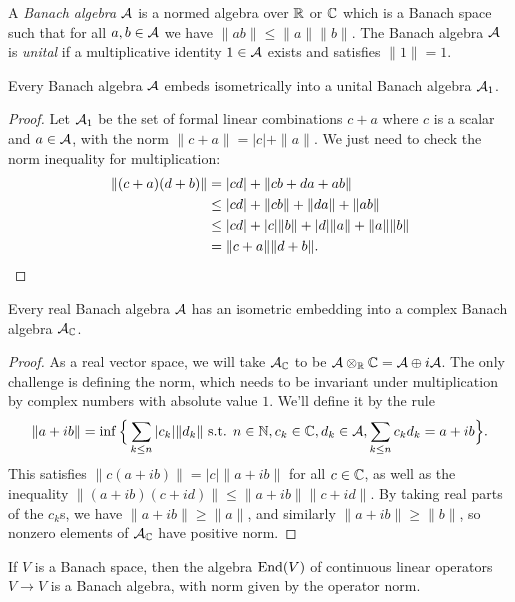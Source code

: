 \begin{defn} A \emph{Banach algebra} $\mathcal{A}$ is a normed algebra over $\mathbb{R}$ or $\mathbb{C}$ which is a Banach space such that for all $a,b \in \mathcal{A}$ we have $\|ab\| \le \|a\|\|b\|$. The Banach algebra $\mathcal{A}$ is \emph{unital} if a multiplicative identity $1 \in \mathcal{A}$ exists and satisfies $\|1\| = 1$.
\end{defn}

\begin{prop} Every Banach algebra $\mathcal{A}$ embeds isometrically into a unital Banach algebra $\mathcal{A}_1$.
\end{prop}
\begin{proof} Let $\mathcal{A}_1$ be the set of formal linear combinations $c + a$ where $c$ is a scalar and $a \in \mathcal{A}$, with the norm $\|c+a\| = |c| + \|a\|$. We just need to check the norm inequality for multiplication:
\begin{align*}
\|(c+a)(d+b)\| &= |cd| + \|cb + da + ab\|\\
&\le |cd| + \|cb\| + \|da\| + \|ab\|\\
&\le |cd| + |c|\|b\| + |d|\|a\| + \|a\|\|b\|\\
&= \|c+a\|\|d+b\|.\qedhere
\end{align*}
\end{proof}

\begin{prop} Every real Banach algebra $\mathcal{A}$ has an isometric embedding into a complex Banach algebra $\mathcal{A}_{\mathbb{C}}$.
\end{prop}
\begin{proof} As a real vector space, we will take $\mathcal{A}_{\mathbb{C}}$ to be $\mathcal{A}\otimes_{\mathbb{R}} \mathbb{C} = \mathcal{A} \oplus i\mathcal{A}$. The only challenge is defining the norm, which needs to be invariant under multiplication by complex numbers with absolute value $1$. We'll define it by the rule
\[
\|a+ib\| = \inf \Big\{\sum_{k \le n} |c_k|\|d_k\| \text{ s.t. } n \in \mathbb{N}, c_k \in \mathbb{C}, d_k \in \mathcal{A}, \sum_{k \le n} c_kd_k = a+ib\Big\}.
\]
This satisfies $\|c(a+ib)\| = |c|\|a+ib\|$ for all $c \in \mathbb{C}$, as well as the inequality $\|(a+ib)(c+id)\| \le \|a+ib\|\|c+id\|$. By taking real parts of the $c_k$s, we have $\|a + ib\| \ge \|a\|$, and similarly $\|a+ib\| \ge \|b\|$, so nonzero elements of $\mathcal{A}_{\mathbb{C}}$ have positive norm.
\end{proof}

\begin{prop} If $V$ is a Banach space, then the algebra $\operatorname{End}(V)$ of continuous linear operators $V \rightarrow V$ is a Banach algebra, with norm given by the operator norm.
\end{prop}

